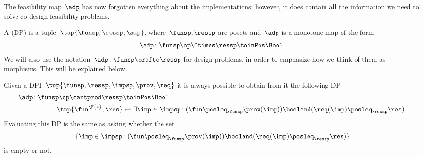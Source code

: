 The feasibility map~$\adp$ has now forgotten everything about the implementations; however, it does contain all the information we need to solve co-design feasibility problems.

\begin{definition}
    \label{def:design-problem}
    A  (DP) is a tuple~$\tup{\funsp, \ressp, \adp}$, where~$\funsp, \ressp$ are posets and~$\adp$ is a monotone map of the form%
    \begin{equation*}
        \label{eq:design_prob_as_monfun}
        \adp \colon  \funsp\op \Ctimes \ressp \toinPos \Bool.
    \end{equation*}
    We will also use the notation~$\adp \colon \funsp \profto \ressp$ for design problems, in order to emphasize how we think of them as morphisms.
    This will be explained below.
\end{definition}

\begin{remark}
    Given a DPI~$\tup{\funsp, \ressp, \impsp, \prov,\req}$ it is always possible to obtain from it the following DP
    \begin{equation}
        \label{eq:dpi_to_dp_1}
        \begin{aligned}
            \adp\colon \funsp\op \cartprod \ressp & \toinPos \Bool                                                                                                     \\
            \tup{\fun^\F{*},\res}                 & \mapsto \exists \imp \in \impsp \colon (\fun \posleq_\funsp \prov(\imp)) \booland (\req(\imp)\posleq_\ressp \res).
        \end{aligned}
    \end{equation}
    Evaluating this DP is the same as asking whether the set
    \begin{equation}
        \label{eq:dpi_to_dp_2}
        \{ \imp \in \impsp \colon (\fun \posleq_\funsp \prov(\imp)) \booland (\req(\imp)\posleq_\ressp \res)\}
    \end{equation}
    is empty or not.
\end{remark}


